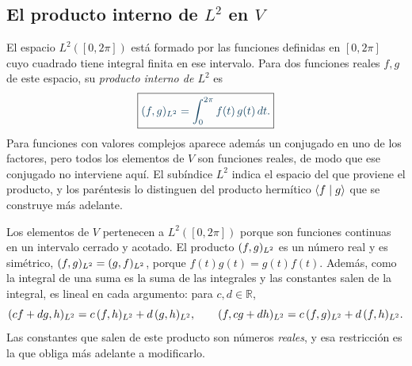\subsection*{El producto interno de $L^2$ en $V$}

\begin{definicionT}
El espacio $L^2([0,2\pi])$ está formado por las funciones definidas en $[0,2\pi]$ cuyo
cuadrado tiene integral finita en ese intervalo. Para dos funciones reales $f,g$ de este
espacio, su \emph{producto interno de $L^2$} es
\[
  \destacado{\Lp fg=\int_0^{2\pi}f(t)\,g(t)\,dt .}
\]
Para funciones con valores complejos aparece además un conjugado en uno de los factores, pero
todos los elementos de $V$ son funciones reales, de modo que ese conjugado no interviene aquí.
El subíndice $L^2$ indica el espacio del que proviene el producto, y los paréntesis lo
distinguen del producto hermítico $\langle f\mid g\rangle$ que se construye más adelante.
\end{definicionT}

Los elementos de $V$ pertenecen a $L^2([0,2\pi])$ porque son funciones continuas en un
intervalo cerrado y acotado. El producto $(f,g)_{L^2}$ es un número real y es simétrico,
$(f,g)_{L^2}=(g,f)_{L^2}$, porque $f(t)g(t)=g(t)f(t)$. Además, como la integral de una suma es la suma de
las integrales y las constantes salen de la integral, es lineal en cada argumento: para
$c,d\in\mathbb R$,
\begin{equation}\label{eq:L2-lineal}
  (cf+dg,h)_{L^2}=c\,(f,h)_{L^2}+d\,(g,h)_{L^2},
  \qquad
  (f,cg+dh)_{L^2}=c\,(f,g)_{L^2}+d\,(f,h)_{L^2} .
\end{equation}
Las constantes que salen de este producto son números \emph{reales}, y esa restricción es la
que obliga más adelante a modificarlo.

